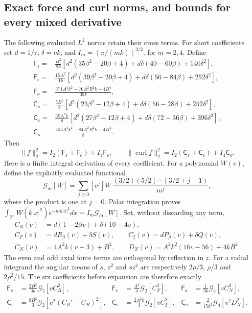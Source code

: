 \subsection{Exact force and curl norms, and bounds for every mixed derivative}

The following evaluated \(L^2\) norms retain their cross terms.  For
short coefficients set \(d=1/\tau\), \(\delta=\nu k\), and
\(I_m=(\pi/(mk))^{3/2}\), for \(m=2,4\).  Define
\begin{align*}
 \mathsf F_s={}&\frac{B^2}{8k}
 [d^2(35\beta^2-20\beta+4)+d\delta(40-60\beta)+140\delta^2],\\
 \mathsf F_e={}&\frac{15A^2}{16}
 [d^2(39\beta^2-20\beta+4)+d\delta(56-84\beta)+252\delta^2],\\
 \mathsf F_o={}&\frac{371A^4k^2-76A^2B^2k+4B^4}{32k},\\
 \mathsf C_s={}&\frac{5B^2}{8}
 [d^2(23\beta^2-12\beta+4)+d\delta(56-28\beta)+252\delta^2],\\
 \mathsf C_e={}&\frac{35A^2k}{8}
 [d^2(27\beta^2-12\beta+4)+d\delta(72-36\beta)+396\delta^2],\\
 \mathsf C_o={}&\frac{455A^4k^2-84A^2B^2k+4B^4}{8}.
\end{align*}
Then
\begin{equation}\label{eq:ag-force-L2}
 \|f\|_2^2=I_2(\mathsf F_s+\mathsf F_e)+I_4\mathsf F_o,
 \qquad
 \|\operatorname{curl}f\|_2^2
       =I_2(\mathsf C_s+\mathsf C_e)+I_4\mathsf C_o.
\end{equation}
Here is a finite integral derivation of every coefficient.  For a polynomial
\(W(v)\), define the explicitly evaluated functional
\[
 \mathcal G_m[W]=\sum_{j\geq0}[v^j]W\,
       \frac{(3/2)(5/2)\cdots(3/2+j-1)}{m^j},
\]
where the product is one at \(j=0\).  Polar integration proves
\(\int_{\mathbb R^3}W(k|x|^2)e^{-mk|x|^2}dx=I_m\mathcal G_m[W]\).
Set, without discarding any term,
\begin{align*}
 C_R(v)&=d(1-2\beta v)+\delta(10-4v),\\
 C_F(v)&=dR_\beta(v)+\delta S(v),\qquad
 C_\xi(v)=dP_\beta(v)+\delta Q(v),\\
 C_N(v)&=4A^2k(v-3)+B^2,\qquad
 D_N(v)=A^2k^2(16v-56)+4kB^2.
\end{align*}
The even and odd axial force terms are orthogonal by reflection in \(z\).
For a radial integrand the angular means of \(s\), \(z^2\) and \(sz^2\)
are respectively \(2\rho/3\), \(\rho/3\) and \(2\rho^2/15\).
The six coefficients before expansion are therefore exactly
\begin{align*}
 \mathsf F_s&=\frac{2B^2}{3k}\mathcal G_2[v C_R^2],&
 \mathsf F_e&=\frac{A^2}{4}\mathcal G_2[C_F^2],&
 \mathsf F_o&=\frac1{3k}\mathcal G_4[v C_N^2],\\
 \mathsf C_s&=\frac{8B^2}{3}\mathcal G_2[v^2(C_R'-C_R)^2],&
 \mathsf C_e&=\frac{2A^2k}{3}\mathcal G_2[v C_\xi^2],&
 \mathsf C_o&=\frac2{15k^2}\mathcal G_4[v^2D_N^2].
\end{align*}

